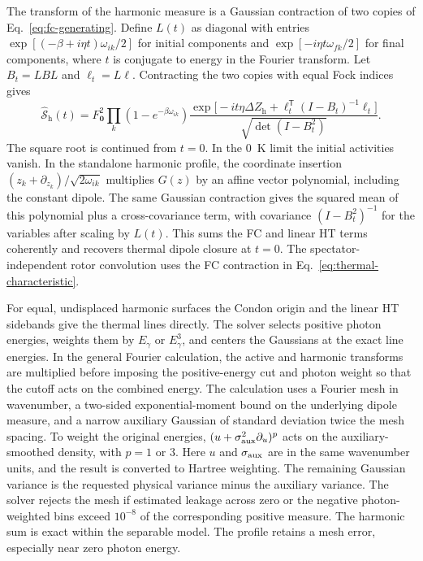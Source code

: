 The transform of the harmonic measure is a Gaussian contraction of two
copies of Eq.~\eqref{eq:fc-generating}. Define $L(t)$ as diagonal with
entries $\exp[(-\beta+i\eta t)\omega_{ik}/2]$ for initial components and
$\exp[-i\eta t\omega_{fk}/2]$ for final components, where $t$ is conjugate
to energy in the Fourier transform. Let $B_t=L B L$ and $\ell_t=L\ell$.
Contracting the two copies with equal Fock indices gives
\begin{equation}
 \widehat{\mathcal S}_{\mathrm h}(t)=
 F_{\mathbf 0}^2\prod_k(1-e^{-\beta\omega_{ik}})
 \frac{\exp\!\bigl[-it\eta\Delta Z_{\mathrm h}+
      \ell_t^{\mathsf T}(I-B_t)^{-1}\ell_t\bigr]}
      {\sqrt{\det(I-B_t^2)}} .
 \label{eq:thermal-characteristic}
\end{equation}
The square root is continued from $t=0$. In the 0~K limit the initial
activities vanish. In the standalone harmonic profile, the coordinate
insertion $(z_k+\partial_{z_k})/\sqrt{2\omega_{ik}}$ multiplies $G(z)$ by
an affine vector polynomial, including the constant dipole. The same
Gaussian contraction gives the squared mean of this polynomial plus a
cross-covariance term, with covariance $(I-B_t^2)^{-1}$ for the variables
after scaling by $L(t)$. This sums the FC and linear HT terms coherently
and recovers thermal dipole closure at $t=0$. The spectator-independent
rotor convolution uses the FC contraction in Eq.~\eqref{eq:thermal-characteristic}.
\cite{huhberger,baiardi}

For equal, undisplaced harmonic surfaces the Condon origin and the
linear HT sidebands give the thermal lines directly. The solver selects
positive photon energies, weights them by $E_\gamma$ or $E_\gamma^3$,
and centers the Gaussians at the exact line energies.
In the general Fourier calculation, the active and harmonic transforms
are multiplied before imposing the positive-energy cut and photon
weight so that the cutoff acts on the combined energy. The calculation
uses a Fourier mesh in wavenumber, a two-sided
exponential-moment bound on the underlying dipole measure, and a narrow
auxiliary Gaussian of standard deviation twice the mesh spacing. To weight
the original energies, $(u+\sigma_{\rm aux}^2\partial_u)^p$ acts on the
auxiliary-smoothed density, with $p=1$ or $3$. Here $u$ and $\sigma_{\rm aux}$
are in the same wavenumber units, and the result is converted to Hartree
weighting. The remaining Gaussian variance is the requested physical
variance minus the auxiliary variance. The solver rejects the mesh if
estimated leakage across zero or the negative photon-weighted bins
exceed $10^{-8}$ of the corresponding positive measure. The harmonic
sum is exact within the separable model. The profile retains a mesh error,
especially near zero photon energy.
